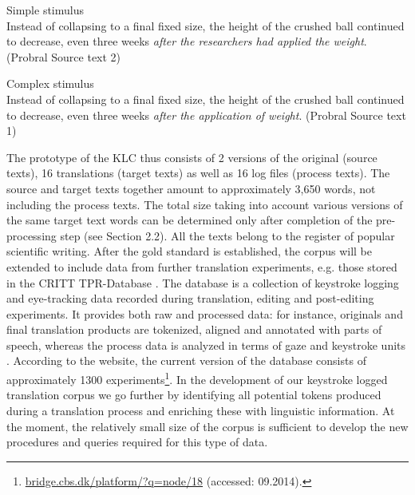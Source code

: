 \documentclass[output=paper]{LSP/langsci}
\begin{document}
\ea Simple stimulus\\
Instead of collapsing to a final fixed size, the height of the crushed ball continued to decrease, even three weeks \emph{after the researchers had applied the weight}. (Probral Source text 2)
\z

\ea
Complex stimulus\\
Instead of collapsing to a final fixed size, the height of the crushed ball continued to decrease, even three weeks \emph{after the application of weight}. (Probral Source text 1)
\z

The prototype of the KLC thus consists of 2 versions of the original (source texts), 16 translations (target texts) as well as 16 log files (process texts). The source and target texts together amount to approximately 3,650 words, not including the process texts. The total size taking into account various versions of the same target text words can be determined only after completion of the pre-processing step (see Section 2.2). All the texts belong to the register of popular scientific writing. After the gold standard is established, the corpus will be extended to include data from further translation experiments, e.g. those stored in the CRITT TPR-Database \citep{Carl2012}. The database is a collection of keystroke logging and eye-tracking data recorded during translation, editing and post-editing experiments. It provides both raw and processed data: for instance, originals and final translation products are tokenized, aligned and annotated with parts of speech, whereas the process data is analyzed in terms of gaze and keystroke units \citep{Carl2012}. According to the website, the current version of the database consists of approximately 1300 experiments\footnote{\url{bridge.cbs.dk/platform/?q=node/18} (accessed: 09.2014).}. In the development of our keystroke logged translation corpus we go further by identifying all potential tokens produced during a translation process and enriching these with linguistic information. At the moment, the relatively small size of the corpus is sufficient to develop the new procedures and queries required for this type of data. 
\end{document}
